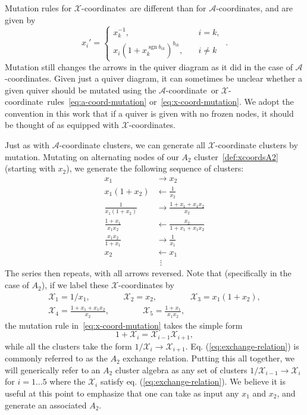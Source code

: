 \documentclass[12pt]{article}
\DeclareMathOperator{\sgn}{sgn}
\def\nl{\nonumber\\}
\def\nn{\nonumber}
\def\x{\mathcal{X}}
\def\xcoord{$\mathcal{X}$-coordinate}
\def\xcoords{$\mathcal{X}$-coordinates}
\def\a{\mathcal{A}}
\def\acoord{$\mathcal{A}$-coordinate}
\def\acoords{$\mathcal{A}$-coordinates}
\begin{document}
Mutation rules for \xcoords\ are different than for \acoords, and are given by
\begin{equation}
  \label{eq:x-coord-mutation}
  x_{i}' =
  \begin{cases}
    x_{k}^{-1}, &\quad i=k,\\
    x_{i} (1+x_{k}^{\sgn b_{i k}})^{b_{i k}}, &\quad i \neq k
  \end{cases}\ .
\end{equation}
Mutation still changes the arrows in the quiver diagram as it did in the case of \acoords.  Given just a quiver diagram, it can sometimes be unclear whether a given quiver should be mutated using the \acoord\ or \xcoord\ rules~\eqref{eq:a-coord-mutation} or~\eqref{eq:x-coord-mutation}. We adopt the convention in this work that if a quiver is given with no frozen nodes, it should be thought of as equipped with \xcoords.

Just as with $\a$-coordinate clusters, we can generate all $\x$-coordinate clusters by mutation. Mutating on alternating nodes of our $A_2$ cluster~\eqref{def:xcoordsA2} (starting with $x_2$), we generate the following sequence of clusters:
\begin{align}
  x_1 &\to x_2 \nl
  x_1(1+x_2) &\leftarrow \frac{1}{x_2} \nl
  \frac{1}{x_1(1+x_2)} &\to \frac{1+x_1+x_1 x_2}{x_2} \\
  \frac{1+x_1}{x_1 x_2} &\leftarrow \frac{x_2}{1+x_1+x_1 x_2} \nl
  \frac{x_1 x_2}{1+x_1} &\to \frac{1}{x_1} \nl
  x_2 &\leftarrow x_1 \nl
  &\ \ \vdots \nn
\end{align}
The series then repeats, with all arrows reversed. Note that (specifically in the case of $A_2$), if we label these $\x$-coordinates by
\begin{gather}\label{def:a2-xcoords}
  \x_1 = 1/x_1, \qquad \qquad \x_2 = x_2, \qquad \qquad \x_3 = x_1(1+x_2), \\ 
  \x_4 = \frac{1+x_1+x_1 x_2}{x_2}, \qquad \qquad \x_5 = \frac{1+x_1}{x_1 x_2}, \nonumber
\end{gather}
the mutation rule in~\eqref{eq:x-coord-mutation} takes the simple form
\begin{equation}\label{eq:exchange-relation}
  1+\x_i = \x_{i-1}\x_{i+1},
\end{equation}
while all the clusters take the form $1/\x_i \to \x_{i+1}$. Eq. (\ref{eq:exchange-relation}) is commonly referred to as the $A_2$ exchange relation. 
Putting this all together, we will generically refer to an $A_2$ cluster algebra as any set of clusters $1/\x_{i-1} \to \x_i$ for $i=1\ldots5$ where the $\x_i$ satisfy eq. (\ref{eq:exchange-relation}). We believe it is useful at this point to emphasize that one can take as input any $x_1$ and $x_2$, and generate an associated $A_2$. 
\end{document}
